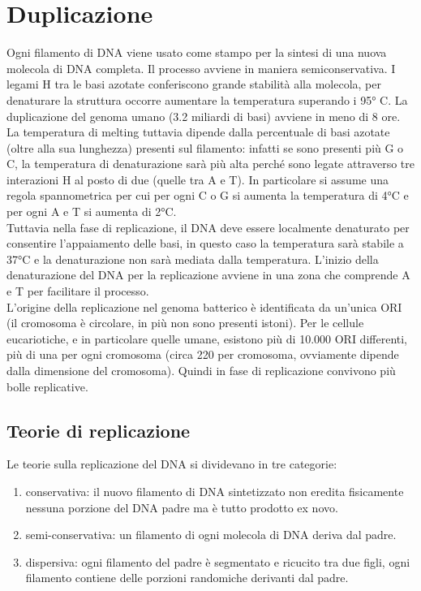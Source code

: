 \section{Duplicazione}
    Ogni filamento di DNA viene usato come stampo per la sintesi di una nuova molecola di DNA completa. Il processo avviene in maniera semiconservativa. I legami H tra le basi azotate conferiscono grande stabilità alla molecola, per denaturare la struttura occorre aumentare la temperatura superando i 95° C. 
    La duplicazione del genoma umano (3.2 miliardi di basi) avviene in meno di 8 ore.\\
    La temperatura di melting tuttavia dipende dalla percentuale di basi azotate (oltre alla sua lunghezza) presenti sul filamento: infatti se sono presenti più G o C, la temperatura di denaturazione sarà più alta perché sono legate attraverso tre interazioni H al posto di due (quelle tra A e T). 
    In particolare si assume una regola spannometrica per cui per ogni C o G si aumenta la temperatura di 4°C e per ogni A e T si aumenta di 2°C.\\
    Tuttavia nella fase di replicazione, il DNA deve essere localmente denaturato per consentire l'appaiamento delle basi, in questo caso la temperatura sarà stabile a 37°C e la denaturazione non sarà mediata dalla temperatura.
    L'inizio della denaturazione del DNA per la replicazione avviene in una zona che comprende A e T per facilitare il processo.\\
    L'origine della replicazione nel genoma batterico è identificata da un'unica ORI (il cromosoma è circolare, in più non sono presenti istoni).
    Per le cellule eucariotiche, e in particolare quelle umane, esistono più di 10.000 ORI differenti, più di una per ogni cromosoma (circa 220 per cromosoma, ovviamente dipende dalla dimensione del cromosoma). Quindi in fase di replicazione convivono più bolle replicative.
    
    \subsection{Teorie di replicazione}
        Le teorie sulla replicazione del DNA si dividevano in tre categorie:
        \begin{enumerate}
            \item conservativa: il nuovo filamento di DNA sintetizzato non eredita fisicamente nessuna porzione del DNA padre ma è tutto prodotto ex novo.
            \item semi-conservativa: un filamento di ogni molecola di DNA deriva dal padre.
            \item dispersiva: ogni filamento del padre è segmentato e ricucito tra due figli, ogni filamento contiene delle porzioni randomiche derivanti dal padre.
        \end{enumerate}
